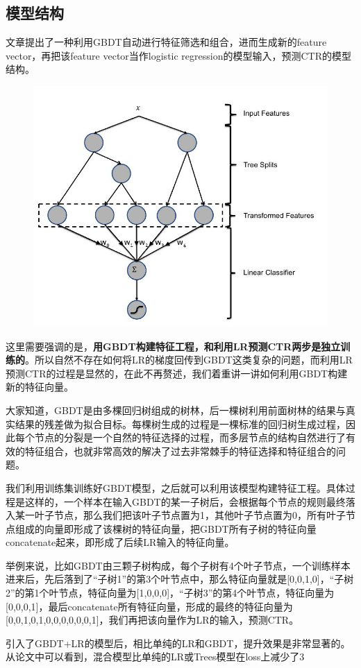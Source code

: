 \documentclass[12pt]{article}
\begin{document}
\subsection{模型结构}
文章提出了一种利用GBDT自动进行特征筛选和组合，进而生成新的feature vector，再把该feature vector当作logistic regression的模型输入，预测CTR的模型结构。
\begin{figure}[H]
    \centering
    \includegraphics[width=.6\textwidth]{fig/Facebook_GBDT_LR_Feature.jpg}
\end{figure}

这里需要强调的是，\textbf{用GBDT构建特征工程，和利用LR预测CTR两步是独立训练的}。所以自然不存在如何将LR的梯度回传到GBDT这类复杂的问题，而利用LR预测CTR的过程是显然的，在此不再赘述，我们着重讲一讲如何利用GBDT构建新的特征向量。

大家知道，GBDT是由多棵回归树组成的树林，后一棵树利用前面树林的结果与真实结果的残差做为拟合目标。每棵树生成的过程是一棵标准的回归树生成过程，因此每个节点的分裂是一个自然的特征选择的过程，而多层节点的结构自然进行了有效的特征组合，也就非常高效的解决了过去非常棘手的特征选择和特征组合的问题。

我们利用训练集训练好GBDT模型，之后就可以利用该模型构建特征工程。具体过程是这样的，一个样本在输入GBDT的某一子树后，会根据每个节点的规则最终落入某一叶子节点，那么我们把该叶子节点置为1，其他叶子节点置为0，所有叶子节点组成的向量即形成了该棵树的特征向量，把GBDT所有子树的特征向量concatenate起来，即形成了后续LR输入的特征向量。

举例来说，比如GBDT由三颗子树构成，每个子树有4个叶子节点，一个训练样本进来后，先后落到了“子树1”的第3个叶节点中，那么特征向量就是[0,0,1,0]，“子树2”的第1个叶节点，特征向量为[1,0,0,0]，“子树3”的第4个叶节点，特征向量为[0,0,0,1]，最后concatenate所有特征向量，形成的最终的特征向量为[0,0,1,0,1,0,0,0,0,0,0,1]，我们再把该向量作为LR的输入，预测CTR。

引入了GBDT+LR的模型后，相比单纯的LR和GBDT，提升效果是非常显著的。从论文中可以看到，混合模型比单纯的LR或Trees模型在loss上减少了3%
\end{document}
